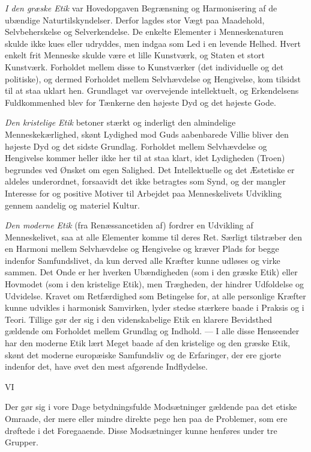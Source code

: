 \documentclass[12pt,a4paper,openany]{book}
\newcommand{\opage}[1]{\marginnote{\footnotesize\textit{[#1]}}}
\begin{document}
\textit{I den græske Etik} var Hovedopgaven Begrænsning og Harmonisering
af de ubændige Naturtilskyndelser. Derfor lagdes
stor Vægt paa Maadehold, Selvbeherskelse og Selverkendelse.
De enkelte Elementer i Menneskenaturen skulde ikke kues eller
udryddes, men indgaa som Led i en levende Helhed. Hvert
enkelt frit Menneske skulde være et lille Kunstværk, og Staten
et stort Kunstværk. Forholdet mellem disse to Kunstværker (det
individuelle og det politiske), og dermed Forholdet mellem Selvhævdelse
og Hengivelse, kom tilsidst til at staa uklart hen.
Grundlaget var overvejende intellektuelt, og Erkendelsens Fuldkommenhed
blev for Tænkerne den højeste Dyd og det højeste
Gode.

\textit{Den kristelige Etik} betoner stærkt og inderligt den almindelige
Menneskekærlighed, skønt Lydighed mod Guds aabenbarede
Villie bliver den højeste Dyd og det sidste Grundlag. Forholdet
mellem Selvhævdelse og Hengivelse kommer heller ikke her
til at staa klart, idet Lydigheden (Troen) begrundes ved Ønsket
om egen Salighed. Det Intellektuelle og det Æstetiske er aldeles
underordnet, forsaavidt det ikke betragtes som Synd, og
der mangler Interesse for og positive Motiver til Arbejdet paa
Menneskelivets Udvikling gennem aandelig og materiel Kultur.

\textit{Den moderne Etik} (fra Renæssancetiden af) fordrer en Udvikling
af Menneskelivet, saa at alle Elementer komme til deres
Ret. Særligt tilstræber den en Harmoni mellem Selvhævdelse
og Hengivelse og kræver Plads for begge indenfor Samfundslivet,
da kun derved alle Kræfter kunne udløses og virke sammen.
Det Onde er her hverken Ubændigheden (som i den græske
Etik) eller Hovmodet (som i den kristelige Etik), men Trægheden,
der hindrer Udfoldelse og Udvidelse. Kravet om Retfærdighed
som Betingelse for, at alle personlige Kræfter kunne udvikles i
\setcounter{footnote}{0}%
\opage{66}harmonisk Samvirken, lyder stedse stærkere baade i Praksis og
i Teori. Tillige gør der sig i den videnskabelige Etik en klarere
Bevidsthed gældende om Forholdet mellem Grundlag og Indhold.
--- I alle disse Henseender har den moderne Etik lært Meget
baade af den kristelige og den græske Etik, skønt det moderne
europæiske Samfundsliv og de Erfaringer, der ere gjorte indenfor
det, have øvet den mest afgørende Indflydelse.

\begin{center}VI\end{center}


Der gør sig i vore Dage betydningsfulde Modsætninger
gældende paa det etiske Omraade, der mere eller mindre direkte
pege hen paa de Problemer, som ere drøftede i det Foregaaende.
Disse Modsætninger kunne henføres under tre Grupper.
\end{document}
